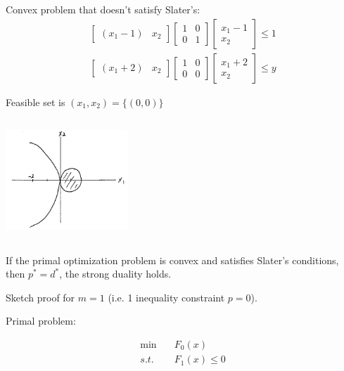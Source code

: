 \begin{example}
	Convex problem that doesn't satisfy Slater's:
	\begin{align*}
	\begin{bmatrix}
	(x_1-1) & x_2
	\end{bmatrix}\begin{bmatrix}
	1&0\\
	0&1
	\end{bmatrix}\begin{bmatrix}
	x_1 - 1\\
	x_2
	\end{bmatrix}\leq 1\\
	\begin{bmatrix}
	(x_1+2) & x_2
	\end{bmatrix}\begin{bmatrix}
	1&0\\
	0&0
	\end{bmatrix}\begin{bmatrix}
	x_1 + 2\\
	x_2
	\end{bmatrix}\leq y
	\end{align*}
\end{example}

Feasible set is $(x_1, x_2) = \{(0,0) \}$

\begin{marginfigure}
\centering
\includegraphics[width=1.8in,height=1.8in]{figures/ch10/figure1125_1.png}
\end{marginfigure}

\begin{theorem}
	If the primal optimization problem is convex and satisfies Slater's conditions, then $p^* = d^*$, the strong duality holds.
\end{theorem}

Sketch proof for $m = 1$ (i.e. 1 inequality constraint $p = 0$).

Primal problem:

\begin{align*}
\min \quad & F_0(x)\\
s.t. \quad & F_1(x) \leq 0
\end{align*}

